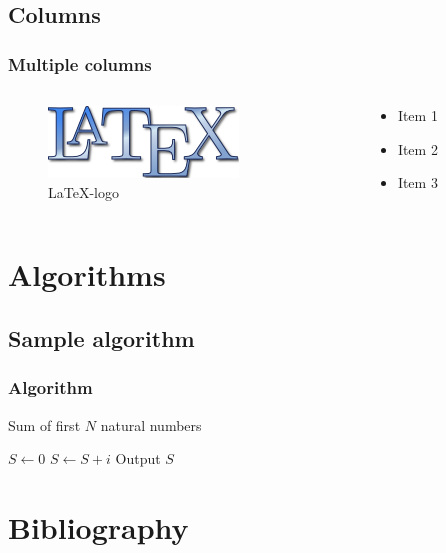 \documentclass{beamer}
\begin{document}
\subsection{Columns}
\begin{frame}
	\frametitle{Multiple columns}
	\begin{columns}
		\begin{column}{0.5\paperwidth}
		 \begin{figure}
			\centering
			\includegraphics[scale=0.1]{figures/latexlogo.png}
			\caption{\LaTeX-logo}
			\end{figure}
		\end{column}
		\begin{column}{0.5\paperwidth}
		 \begin{itemize}
			\item Item 1
			\item Item 2
			\item Item 3
		 \end{itemize}
		\end{column}	
	\end{columns}
\end{frame}

\section{Algorithms}
\subsection{Sample algorithm}
\begin{frame}
	\frametitle{Algorithm}
	\begin{algorithm}[H]
\fontsize{10pt}{12}\selectfont
\caption{Sum of first $N$ natural numbers}
\begin{algorithmic}[1]
\State $S \leftarrow 0$
\State $ S \leftarrow S + i $
\EndFor{}
\State Output $S$
\end{algorithmic}
\end{algorithm}
\end{frame}

\section{Bibliography}
\end{document}
